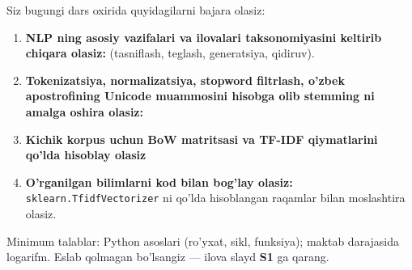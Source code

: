 \documentclass[aspectratio=169,11pt]{beamer}
\begin{document}
\begin{frame}{Siz bugungi dars oxirida quyidagilarni bajara olasiz:}
  \begin{enumerate}\setlength\itemsep{8pt}
    \item \textbf{NLP ning asosiy vazifalari va ilovalari taksonomiyasini keltirib chiqara olasiz:}
        (tasniflash, teglash, generatsiya, qidiruv).
    \item \textbf{Tokenizatsiya, normalizatsiya, stopword filtrlash, o'zbek apostrofining Unicode muammosini hisobga olib stemming ni amalga oshira olasiz:}
    \item \textbf{Kichik korpus uchun BoW matritsasi va TF-IDF
          qiymatlarini qo'lda hisoblay olasiz}
    \item \textbf{O'rganilgan bilimlarni kod bilan bog'lay olasiz:}
          \texttt{sklearn.TfidfVectorizer} ni qo'lda hisoblangan
          raqamlar bilan moslashtira olasiz.
  \end{enumerate}
  \vspace{4pt}
  \begin{tcolorbox}[defbox,title=Oldindan talab]
    \footnotesize
    Minimum talablar: Python asoslari (ro'yxat, sikl, funksiya);
    maktab darajasida logarifm.
    Eslab qolmagan bo'lsangiz --- ilova slayd \textbf{S1} ga qarang.
  \end{tcolorbox}
\end{frame}
\end{document}
